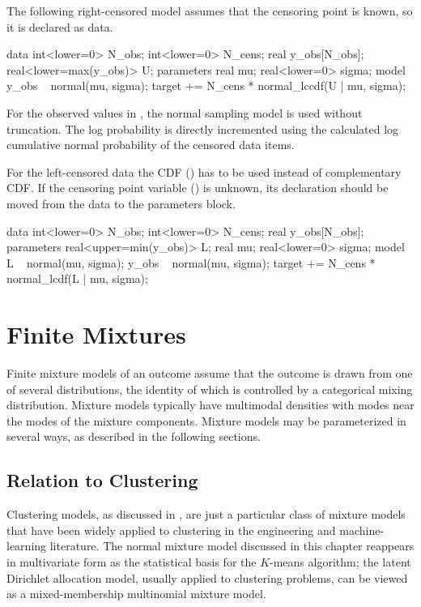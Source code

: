 The following right-censored model assumes
that the censoring point is known, so it is declared as data.
%
\begin{stancode}
data {
  int<lower=0> N_obs;
  int<lower=0> N_cens;
  real y_obs[N_obs];
  real<lower=max(y_obs)> U;
}
parameters {
  real mu;
  real<lower=0> sigma;
}
model {
  y_obs ~ normal(mu, sigma); 
  target += N_cens * normal_lccdf(U | mu, sigma);
}
\end{stancode}
%
For the observed values in , the normal sampling model is
used without truncation.  The log probability is directly incremented
using the calculated log cumulative normal probability of the censored
data items.

For the left-censored data the CDF () has to be
used instead of complementary CDF.  If the censoring point variable
() is unknown, its declaration should be moved from the data
to the parameters block.
%
\begin{stancode}
data {
  int<lower=0> N_obs;
  int<lower=0> N_cens;
  real y_obs[N_obs];
}
parameters {
  real<upper=min(y_obs)> L;
  real mu;
  real<lower=0> sigma;
}
model {
  L ~ normal(mu, sigma);
  y_obs ~ normal(mu, sigma);
  target += N_cens * normal_lcdf(L | mu, sigma);
}
\end{stancode}
%


\chapter{Finite Mixtures}\label{mixture-modeling.chapter}

\noindent
Finite mixture models of an outcome assume that the outcome is drawn
from one of several distributions, the identity of which is controlled
by a categorical mixing distribution. Mixture models typically have
multimodal densities with modes near the modes of the mixture
components.  Mixture models may be parameterized in several ways, as
described in the following sections.

\section{Relation to Clustering}\label{clustering-mixture.section}

Clustering models, as discussed in , are just a
particular class of mixture models that have been widely applied to
clustering in the engineering and machine-learning literature.  The
normal mixture model discussed in this chapter reappears in
multivariate form as the statistical basis for the $K$-means
algorithm;  the latent Dirichlet allocation model, usually applied to
clustering problems, can be viewed as a mixed-membership multinomial
mixture model. 


